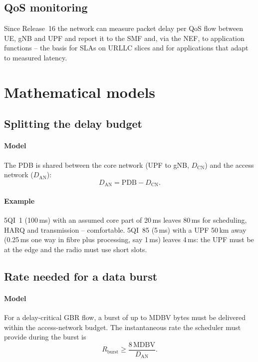 \documentclass[11pt,a4paper]{article}
\begin{document}
\subsection{QoS monitoring}
Since Release~16 the network can measure packet delay per QoS flow between UE, gNB and UPF and report it to the SMF and, via the NEF, to
application functions -- the basis for SLAs on URLLC slices and for applications that adapt to measured latency.

\section{Mathematical models}

\subsection{Splitting the delay budget}\label{sec:pdb}
\paragraph{Model} The PDB is shared between the core network (UPF to gNB, $D_{\mathrm{CN}}$) and the access network ($D_{\mathrm{AN}}$):
\begin{equation}\label{eq:pdb}
  D_{\mathrm{AN}} = \mathrm{PDB} - D_{\mathrm{CN}} .
\end{equation}
\paragraph{Example} 5QI~1 (100\,ms) with an assumed core part of 20\,ms leaves 80\,ms for scheduling, HARQ and transmission -- comfortable. 5QI~85
(5\,ms) with a UPF 50\,km away (0.25\,ms one way in fibre plus processing, say 1\,ms) leaves 4\,ms: the UPF must be at the edge and the radio
must use short slots.

\subsection{Rate needed for a data burst}\label{sec:mdbv}
\paragraph{Model} For a delay-critical GBR flow, a burst of up to MDBV bytes must be delivered within the access-network budget. The
instantaneous rate the scheduler must provide during the burst is
\begin{equation}\label{eq:mdbv}
  R_{\mathrm{burst}} \ge \frac{8\,\mathrm{MDBV}}{D_{\mathrm{AN}}} .
\end{equation}
\end{document}
